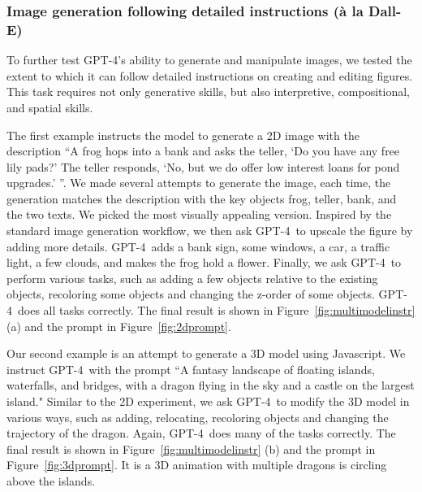 \subsubsection{Image generation following detailed instructions (\`a la Dall-E)}\label{sec:2d3d_example}
To further test GPT-4's ability to generate and manipulate images, we tested the extent to which it can follow detailed instructions on creating and editing figures. This task requires not only generative skills, but also interpretive, compositional, and spatial skills. 

The first example instructs the model to generate a 2D image with the description ``A frog hops into a bank and asks the teller, `Do you have any free lily pads?' The teller responds, `No, but we do offer low interest loans for pond upgrades.' ''. We made several attempts to generate the image, each time, the generation matches the description with the key objects frog, teller, bank, and the two texts. We picked the most visually appealing version. Inspired by the standard image generation workflow, we then ask GPT-4\ to upscale the figure by adding more details. GPT-4\ adds a bank sign, some windows, a car, a traffic light, a few clouds, and makes the frog hold a flower. Finally, we ask GPT-4\ to perform various tasks, such as adding a few objects relative to the existing objects, recoloring some objects and changing the z-order of some objects. GPT-4\ does all tasks correctly. The final result is shown in Figure~\ref{fig:multimodelinstr} (a) and the prompt in Figure~\ref{fig:2dprompt}.

Our second example is an attempt to generate a 3D model using Javascript. We instruct GPT-4\ with the prompt ``A fantasy landscape of floating islands, waterfalls, and bridges, with a dragon flying in the sky and a castle on the largest island." Similar to the 2D experiment, we ask GPT-4\ to modify the 3D model in various ways, such as adding, relocating, recoloring objects and changing the trajectory of the dragon. Again, GPT-4\ does many of the tasks correctly. The final result is shown in Figure~\ref{fig:multimodelinstr} (b) and the prompt in Figure~\ref{fig:3dprompt}. It is a 3D animation with multiple dragons is circling above the islands.

